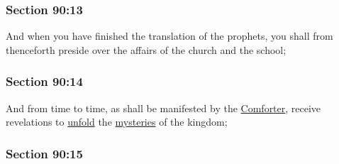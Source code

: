 
	\subsubsection{Section 90:13} %
		\label{DC90-13}

		And when you have finished the translation of the prophets, you shall from thenceforth preside over the affairs of the church and the school;


	\subsubsection{Section 90:14} %
		\label{DC90-14}

		And from time to time, as shall be manifested by the \hyperref[COMFORTER]{Comforter}, receive revelations to \hyperref[UNFOLD]{unfold} the \hyperref[MYSTERY]{mysteries} of the kingdom;


	\subsubsection{Section 90:15} %
		\label{DC90-15}

